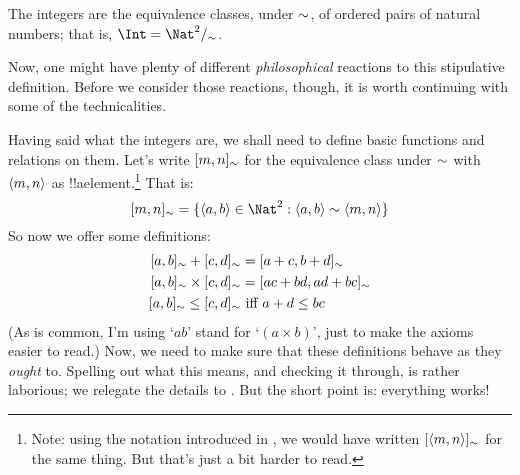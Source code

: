 \documentclass[../../../include/open-logic-section]{subfiles}
\begin{document}
\begin{defn}
		The integers are the equivalence classes, under $\sim$, of  ordered pairs of natural numbers; that is, $\Int = \equivclass{\Nat^2}{\Intequiv}$.
\end{defn}

Now, one might have plenty of different \emph{philosophical} reactions to this stipulative definition. Before we consider those reactions, though, it is worth continuing with some of the technicalities. 

Having said what the integers are, we shall need to define basic functions and relations on them. Let's write $[m, n]_{\sim}$ for the equivalence class under $\sim$ with $\langle m, n \rangle$ as !!a{element}.\footnote{Note: using the notation introduced in , we would have written $[\langle m,n \rangle]_{\sim}$ for the same thing. But that's just a bit harder to read.} That is: 
	$$\equivrep{m, n}{\Intequiv} = \Setabs{\tuple{a, b} \in \Nat^2}{\tuple{a, b}\Intequiv \tuple{m, n}}$$
So now we offer some definitions:
	\begin{align*}
		\equivrep{a, b}{\Intequiv} + \equivrep{c, d}{\Intequiv} &= \equivrep{a + c, b + d}{\Intequiv}\\
		\equivrep{a, b}{\Intequiv} \times \equivrep{c, d}{\Intequiv} &= \equivrep{a c + b  d, a  d + b c}{\Intequiv}\\
		\equivrep{a, b}{\Intequiv} \leq \equivrep{c, d}{\Intequiv} &\text{ iff }a + d \leq b c
	\end{align*}	
(As is common, I'm using `$ab$' stand for `$(a \times b)$', just to make the axioms easier to read.) Now, we need to make sure that these definitions behave as they \emph{ought} to. Spelling out what this means, and checking it through, is rather laborious; we relegate the details to . But the short point is: everything works! 
\end{document}
